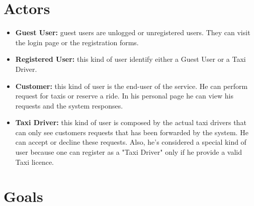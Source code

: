 \documentclass{report}
\begin{document}
	\section{Actors}
		\begin{itemize}
		  \item \textbf{Guest User:}\label{sec:normaluser} guest users are unlogged or unregistered users. They can visit the login page or the registration forms.

		  \item \textbf{Registered User:}\label{sec:ruser} this kind of user identify either a Guest User or a Taxi Driver.

		  \item \textbf{Customer:}\label{sec:customer} this kind of user is the end-user of the service. He can perform request for taxis or reserve a ride. In his personal page he can view his requests and the system responses.

		  \item \textbf{Taxi Driver:}\label{sec:tdriver} this kind of user is composed by the actual taxi drivers that can only see customers requests that has been forwarded by the system. He can accept or decline these requests. Also, he's considered a special kind of user because one can register as a "Taxi Driver" only if he provide a valid Taxi licence.
		\end{itemize}

	\section{Goals}
\end{document}
